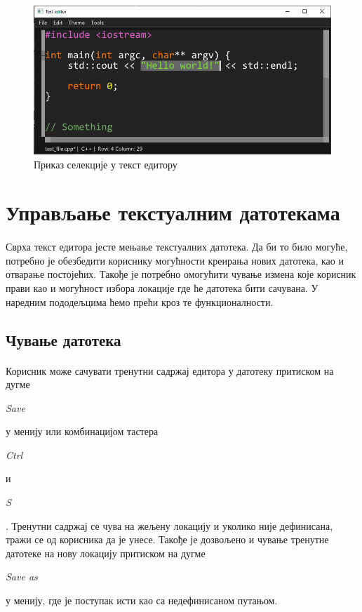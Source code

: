 \documentclass[12pt,oneside]{memoir}
\begin{document}
\begin{figure}[!ht]
	\centering
	\includegraphics[width=1.0\textwidth]{images/selection.png}
	\caption{Приказ селекције у текст едитору}
	\label{fig:selection}
\end{figure}

\section{Управљање текстуалним датотекама}
\paragraph{}
Сврха текст едитора јесте мењање текстуалних датотека. Да би то било могуће,
потребно је обезбедити кориснику могућности креирања нових датотека, као и
отварање постојећих. Такође је потребно омогућити чување измена које корисник
прави као и могућност избора локације где ће датотека бити сачувана.  У наредним
пододељцима ћемо прећи кроз те функционалности. 

\subsection{Чување датотека}
\paragraph{}
Корисник може сачувати тренутни садржај едитора у датотеку притиском на дугме 
\begin{latinica}\textit{Save}\end{latinica} у менију или комбинацијом
тастера \begin{latinica}\textit{Ctrl}\end{latinica} и
\begin{latinica}\textit{S}\end{latinica}. Тренутни садржај се чува на 
жељену локацију и уколико није дефинисана, тражи се од корисника
да је унесе. Такође је дозвољено и чување тренутне датотеке на нову локацију
притиском на дугме \begin{latinica}\textit{Save as}\end{latinica} у менију, где
је поступак исти као са недефинисаном путањом.
\end{document}

